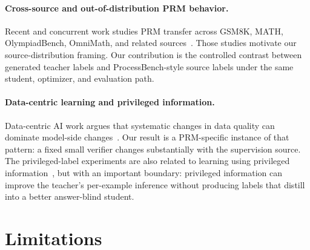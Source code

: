 \documentclass{article}
\begin{document}
\paragraph{Cross-source and out-of-distribution PRM behavior.}
Recent and concurrent work studies PRM transfer across GSM8K, MATH, OlympiadBench, OmniMath, and related sources~\cite{processlid,retrievalprm}.
Those studies motivate our source-distribution framing.
Our contribution is the controlled contrast between generated teacher labels and ProcessBench-style source labels under the same student, optimizer, and evaluation path.

\paragraph{Data-centric learning and privileged information.}
Data-centric AI work argues that systematic changes in data quality can dominate model-side changes~\cite{dataperf}.
Our result is a PRM-specific instance of that pattern: a fixed small verifier changes substantially with the supervision source.
The privileged-label experiments are also related to learning using privileged information~\cite{lupi}, but with an important boundary: privileged information can improve the teacher's per-example inference without producing labels that distill into a better answer-blind student.

\section{Limitations}
\end{document}
